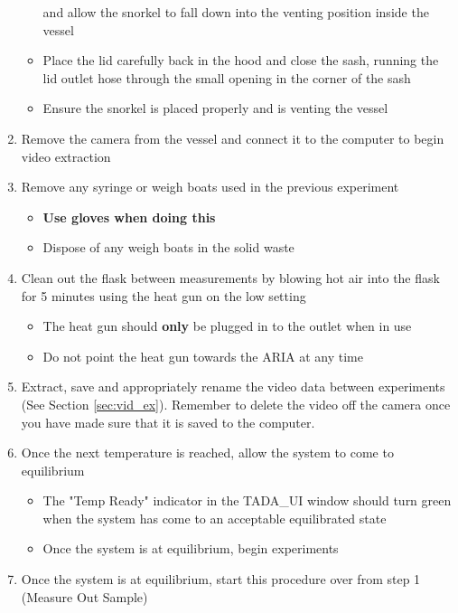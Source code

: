 \documentclass[letterpaper,11pt]{article}
\begin{document}
\begin{enumerate}
\begin{itemize}
            and allow the snorkel to fall down into the venting
            position inside the vessel
        \item Place the lid carefully back in the hood and close the sash, 
            running the lid outlet hose through the small opening in the corner
            of the sash
        \item Ensure the snorkel is placed properly and is venting the vessel
        \end{itemize}
	\item Remove the camera from the vessel and connect it to the computer to
        begin video extraction
    \item Remove any syringe or weigh boats used in the previous experiment
        \begin{itemize}
        \item \textbf{Use gloves when doing this}
        \item Dispose of any weigh boats in the solid waste
        \end{itemize}
    \item Clean out the flask between measurements by blowing hot air into
            the flask for 5 minutes using the heat gun on the low setting
        \begin{itemize}
        \item The heat gun should \textbf{only} be plugged in to the outlet 
            when in use
        \item Do not point the heat gun towards the ARIA at any time
        \end{itemize}
    
    \item Extract, save and appropriately rename the video data between 
        experiments (See Section \ref{sec:vid_ex}). Remember to delete the video
        off the camera once you have made sure that it is saved to the computer.
    \item Once the next temperature is reached, allow the system to come to 
        equilibrium
        \begin{itemize}
        \item The "Temp Ready" indicator in the TADA\_UI window should turn 
            green when the system has come to an acceptable equilibrated state
        \item Once the system is at equilibrium, begin experiments
        \end{itemize}
    \item Once the system is at equilibrium, start this procedure over from 
        step 1 (Measure Out Sample)
    \end{enumerate}
\end{document}
